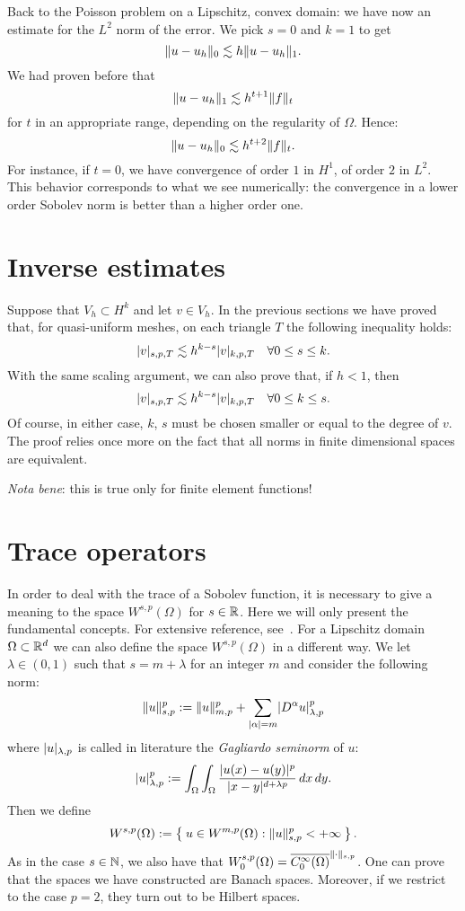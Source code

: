 \begin{example}
Back to the Poisson problem on a Lipschitz, convex domain: we have now an estimate for the $L^2$ norm of the error. We pick $s = 0$ and $k=1$ to get
\[
\lVert u-u_h\rVert_0 \lesssim h \lVert u-u_h\rVert_1.
\]
We had proven before that
\[
\lVert u-u_h\rVert_1 \lesssim h^{t+1} \lVert f\rVert_t
\]
for $t$ in an appropriate range, depending on the regularity of $\Omega$. Hence:
\[
\lVert u-u_h\rVert_0 \lesssim h^{t+2} \lVert f\rVert_t.
\]
For instance, if $t=0$, we have convergence of order $1$ in $H^1$, of order $2$ in $L^2$. This behavior corresponds to what we see numerically: the convergence in a lower order Sobolev norm is better than a higher order one.
\end{example}


\section{Inverse estimates}
Suppose that $V_h \subset H^k$ and let $v \in V_h$. In the previous sections we have proved that, for quasi-uniform meshes, on each triangle $T$ the following inequality holds:
\[
\lvert v\rvert_{s,p,T} \lesssim h^{k-s} \lvert v\rvert_{k,p,T} \quad \forall 0 \le s \le k.
\]
With the same scaling argument, we can also prove that, if $h<1$, then
\[
\lvert v\rvert_{s,p,T} \lesssim h^{k-s} \lvert v\rvert_{k,p,T} \quad \forall 0 \le k \le s.
\]
Of course, in either case, $k$, $s$ must be chosen smaller or equal to the degree of $v$. The proof relies once more on the fact that all norms in finite dimensional spaces are equivalent.

\emph{Nota bene}: this is true only for finite element functions!

\section{Trace operators}\label{sec:trace_operators}
In order to deal with the trace of a Sobolev function, it is necessary to give a meaning to the space $W^{s,p}(\Omega)$ for $s\in \mathbb{R}$. Here we will only present the fundamental concepts. For extensive reference, see~\cite{fract_sob}. For a Lipschitz domain $\Omega \subset \mathbb{R}^d$ we can also define the space $W^{s,p}(\Omega)$ in a different way. We let $\lambda \in (0,1)$ such that $s = m+\lambda$ for an integer $m$ and consider the following norm:
\[
\lVert u\rVert_{s,p}^p := \lVert u\rVert_{m,p}^p + \sum_{\lvert\alpha\rvert=m} \lvert D^\alpha u\rvert^p_{\lambda,p}
\]
where $\lvert u\rvert_{\lambda,p}$ is called in literature the \emph{Gagliardo seminorm} of $u$:
\[
\lvert u\rvert^p_{\lambda,p} := \int_{\Omega} \int_{\Omega} \frac{\lvert u(x)-u(y)\rvert^p}{\lvert x-y\rvert^{d+\lambda p}} \,dx \,dy.
\]
Then we define
\[
W^{s,p}(\Omega) := \Set{u \in W^{m,p}(\Omega) : \lVert u\rVert_{s,p}^p < +\infty}.
\]
As in the case $s \in \mathbb{N}$, we also have that $W^{s,p}_0(\Omega) = \overline{C^\infty_0(\Omega)}^{\lVert\cdot\rVert_{s,p}}$. One can prove that the spaces we have constructed are Banach spaces. Moreover, if we restrict to the case $p=2$, they turn out to be Hilbert spaces.

